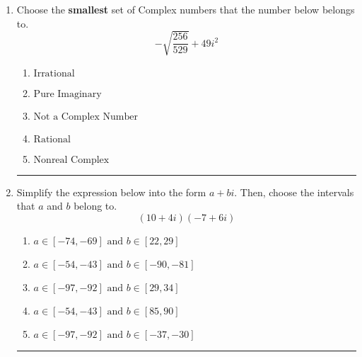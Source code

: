 \documentclass[14pt]{extbook}
\newcommand{\litem}[1]{\item#1\hspace*{-1cm}\rule{\textwidth}{0.4pt}}
\begin{document}
\begin{enumerate}
{\begin{enumerate}[label=\Alph*.]
\end{enumerate} }
\litem{
Choose the \textbf{smallest} set of Complex numbers that the number below belongs to.\[ -\sqrt{\frac{256}{529}} + 49i^2 \]\begin{enumerate}[label=\Alph*.]
\item \( \text{Irrational} \)
\item \( \text{Pure Imaginary} \)
\item \( \text{Not a Complex Number} \)
\item \( \text{Rational} \)
\item \( \text{Nonreal Complex} \)

\end{enumerate} }
\litem{
Simplify the expression below into the form $a+bi$. Then, choose the intervals that $a$ and $b$ belong to.\[ (10 + 4 i)(-7 + 6 i) \]\begin{enumerate}[label=\Alph*.]
\item \( a \in [-74, -69] \text{ and } b \in [22, 29] \)
\item \( a \in [-54, -43] \text{ and } b \in [-90, -81] \)
\item \( a \in [-97, -92] \text{ and } b \in [29, 34] \)
\item \( a \in [-54, -43] \text{ and } b \in [85, 90] \)
\item \( a \in [-97, -92] \text{ and } b \in [-37, -30] \)

\end{enumerate} }
\end{enumerate}
\end{document}
